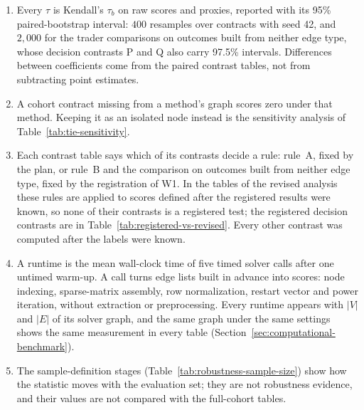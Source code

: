 \begin{enumerate}
\item Every $\tau$ is Kendall's $\tau_b$ on raw scores and proxies, reported with its 95\% paired-bootstrap interval: $400$ resamples over contracts with seed 42, and $2{,}000$ for the trader comparisons on outcomes built from neither edge type, whose decision contrasts P and Q also carry 97.5\% intervals. Differences between coefficients come from the paired contrast tables, not from subtracting point estimates.
\item A cohort contract missing from a method's graph scores zero under that method. Keeping it as an isolated node instead is the sensitivity analysis of Table~\ref{tab:tie-sensitivity}.
\item Each contrast table says which of its contrasts decide a rule: rule~A, fixed by the plan, or rule~B and the comparison on outcomes built from neither edge type, fixed by the registration of W1. In the tables of the revised analysis these rules are applied to scores defined after the registered results were known, so none of their contrasts is a registered test; the registered decision contrasts are in Table~\ref{tab:registered-vs-revised}. Every other contrast was computed after the labels were known.
\item A runtime is the mean wall-clock time of five timed solver calls after one untimed warm-up. A call turns edge lists built in advance into scores: node indexing, sparse-matrix assembly, row normalization, restart vector and power iteration, without extraction or preprocessing. Every runtime appears with $|V|$ and $|E|$ of its solver graph, and the same graph under the same settings shows the same measurement in every table (Section~\ref{sec:computational-benchmark}).
\item The sample-definition stages (Table~\ref{tab:robustness-sample-size}) show how the statistic moves with the evaluation set; they are not robustness evidence, and their values are not compared with the full-cohort tables.
\end{enumerate}


